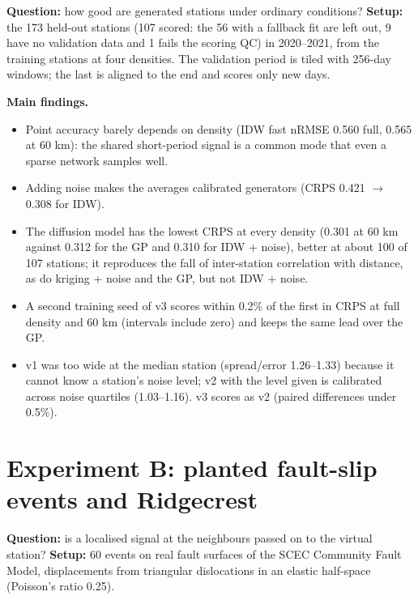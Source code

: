 \documentclass[11pt,a4paper]{article}
\newcommand{\resulttable}[1]{\begin{center}\scriptsize\setlength{\tabcolsep}{3pt}\end{center}}
\begin{document}
\textbf{Question:} how good are generated stations under ordinary conditions? \textbf{Setup:} the 173 held-out stations (107 scored: the 56 with a fallback fit are left out, 9 have no validation data and 1 fails the scoring QC) in 2020–2021, from the training stations at four densities. The validation period is tiled with 256-day windows; the last is aligned to the end and scores only new days.

\resulttable{experiment_a_table}

\textbf{Main findings.}
\begin{itemize}
\item Point accuracy barely depends on density (IDW fast nRMSE 0.560 full, 0.565 at 60 km): the shared short-period signal is a common mode that even a sparse network samples well.
\item Adding noise makes the averages calibrated generators (CRPS 0.421 $\to$ 0.308 for IDW).
\item The diffusion model has the lowest CRPS at every density (0.301 at 60 km against 0.312 for the GP and 0.310 for IDW + noise), better at about 100 of 107 stations; it reproduces the fall of inter-station correlation with distance, as do kriging + noise and the GP, but not IDW + noise.
\item A second training seed of v3 scores within 0.2\% of the first in CRPS at full density and 60 km (intervals include zero) and keeps the same lead over the GP.
\item v1 was too wide at the median station (spread/error 1.26–1.33) because it cannot know a station's noise level; v2 with the level given is calibrated across noise quartiles (1.03–1.16). v3 scores as v2 (paired differences under 0.5\%).
\end{itemize}

\resulttable{significance_table}

\section{Experiment B: planted fault-slip events and Ridgecrest}

\textbf{Question:} is a localised signal at the neighbours passed on to the virtual station? \textbf{Setup:} 60 events on real fault surfaces of the SCEC Community Fault Model, displacements from triangular dislocations in an elastic half-space (Poisson's ratio 0.25).
\end{document}
